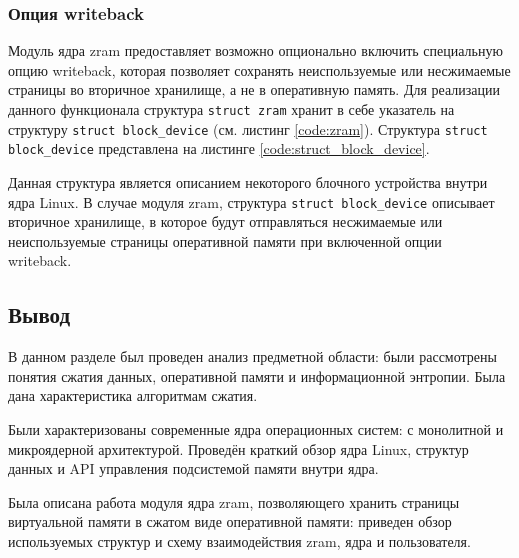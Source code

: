 \subsubsection{Опция writeback}

Модуль ядра zram предоставляет возможно опционально включить специальную опцию writeback, которая позволяет сохранять неиспользуемые или несжимаемые страницы во вторичное хранилище, а не в оперативную память. Для реализации данного функционала структура \texttt{struct zram} хранит в себе указатель на структуру \texttt{struct block\_device} (см. листинг \ref{code:zram}). Структура \texttt{struct block\_device} представлена на листинге \ref{code:struct_block_device}.

Данная структура является описанием некоторого блочного устройства внутри ядра Linux. В случае модуля zram, структура \texttt{struct block\_device} описывает вторичное хранилище, в которое будут отправляться несжимаемые или неиспользуемые страницы оперативной памяти при включенной опции\\ writeback.


\subsection{Вывод}

В данном разделе был проведен анализ предметной области: были рассмотрены понятия сжатия данных, оперативной памяти и информационной энтропии. Была дана характеристика алгоритмам сжатия. 

Были характеризованы современные ядра операционных систем: с монолитной и микроядерной архитектурой. Проведён краткий обзор ядра Linux, структур данных и API управления подсистемой памяти внутри ядра. 

Была описана работа модуля ядра zram, позволяющего хранить страницы виртуальной памяти в сжатом виде оперативной памяти: приведен обзор используемых структур и схему взаимодействия zram, ядра и пользователя.

\pagebreak
